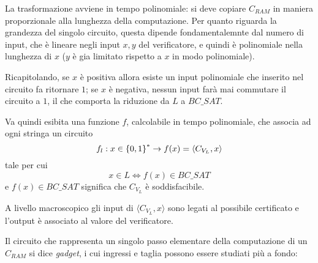 La trasformazione avviene in tempo polinomiale: si deve copiare $C_{RAM}$ in maniera proporzionale alla lunghezza della computazione. Per quanto riguarda la grandezza del singolo circuito, questa dipende fondamentalemnte dal numero di input, che è lineare negli input $x,y$ del verificatore, e quindi è polinomiale nella lunghezza di $x$ ($y$ è gia limitato rispetto a $x$ in modo polinomiale).

Ricapitolando, se $x$ è positiva allora esiste un input polinomiale che inserito nel circuito fa ritornare $1$; se $x$ è negativa, nessun input farà mai commutare il circuito a $1$, il che comporta la riduzione da $L$ a $BC\_SAT$.


Va quindi esibita una funzione $f$, calcolabile in tempo polinomiale, che associa ad ogni stringa un circuito
\begin{equation*}
    f_l : x \in \left\{0,1\right\}^{*} \to f(x) = \langle C_{V_{L}},x \rangle
\end{equation*}
tale per cui
\begin{equation*}
    x \in L \Leftrightarrow f(x) \in BC\_SAT
\end{equation*}
e $f(x) \in BC\_SAT$ significa che $C_{V_{L}}$ è soddisfacibile.

A livello macroscopico gli input di $\langle C_{V_{L}},x \rangle$ sono legati al possibile certificato e l'output è associato al valore del verificatore.

Il circuito che rappresenta un singolo passo elementare della computazione di un $C_{RAM}$ si dice \emph{gadget}, i cui ingressi e taglia possono essere studiati più a fondo: 


